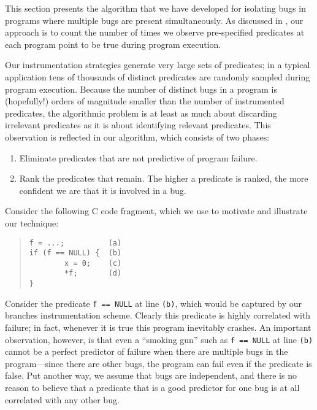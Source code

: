 This section presents the algorithm that we have developed for
isolating bugs in programs where multiple bugs are present
simultaneously.  As discussed in , our
approach is to count the number of times we observe pre-specified
predicates at each program point to be true during program
execution.

Our instrumentation strategies generate very large sets
of predicates; in a typical application tens of thousands of distinct
predicates are randomly sampled during program execution.  Because the
number of distinct bugs in a program is (hopefully!) orders of
magnitude smaller than the number of instrumented predicates, the
algorithmic problem is at least as much about discarding irrelevant
predicates as it is about identifying relevant predicates.  This
observation is reflected in our algorithm, which consists of two phases:
\begin{enumerate}
\item Eliminate predicates that are not predictive of program failure.

\item Rank the predicates that remain.  The higher a predicate is ranked,
the more confident we are that it is involved in a bug.
\end{enumerate}

Consider the following C code fragment, which we use to motivate and illustrate
our technique:
\begin{quote}
\begin{verbatim}
f = ...;          (a)
if (f == NULL) {  (b)
        x = 0;    (c)
        *f;       (d)
}
\end{verbatim}
\end{quote}
Consider the predicate {\tt f == NULL} at line {\tt (b)}, which would
be captured by our branches instrumentation scheme.  Clearly
this predicate is highly correlated with failure; in fact, whenever it
is true this program inevitably crashes.  An important observation,
however, is that even a ``smoking gun'' such as {\tt f == NULL} at
line {\tt (b)} cannot be a perfect predictor of failure when there are
multiple bugs in the program---since there are other bugs, the program can fail
even if the predicate is false.  Put another way, we assume
that bugs are independent, and there is no reason to believe that
a predicate that is a good predictor for one bug is at all correlated
with any other bug.

